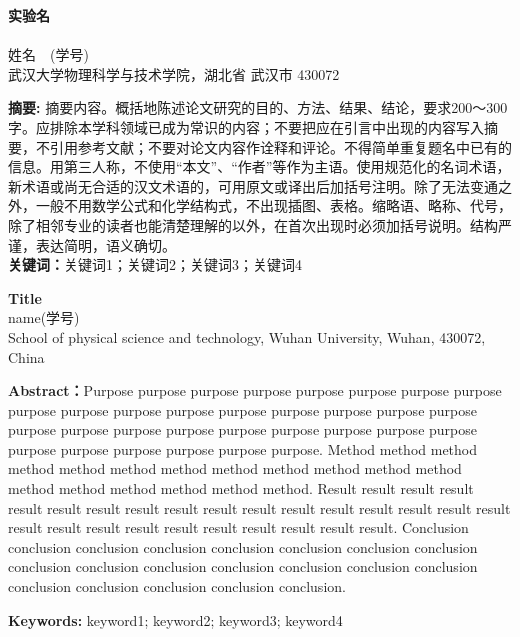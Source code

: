 \documentclass{whureport}
\newcommand{\name}{姓名}
\newcommand{\stuid}{学号}
\newcommand{\Name}{name}
\newcommand{\newtitle}{实验名}
\newcommand{\etitle}{Title}
\begin{document}
\pagestyle{maincontent} 


\begin{center}
 \textbf{\newtitle}\\
~\\
 \kaishu \name \ \ (\stuid)\\
 \kaishu 武汉大学物理科学与技术学院，湖北省 武汉市 430072\\
\end{center}
\textbf{摘\quad 要:}
摘要内容。概括地陈述论文研究的目的、方法、结果、结论，要求200～300字。应排除本学科领域已成为常识的内容；不要把应在引言中出现的内容写入摘要，不引用参考文献；不要对论文内容作诠释和评论。不得简单重复题名中已有的信息。用第三人称，不使用“本文”、“作者”等作为主语。使用规范化的名词术语，新术语或尚无合适的汉文术语的，可用原文或译出后加括号注明。除了无法变通之外，一般不用数学公式和化学结构式，不出现插图、表格。缩略语、略称、代号，除了相邻专业的读者也能清楚理解的以外，在首次出现时必须加括号说明。结构严谨，表达简明，语义确切。\\
\textbf{关键词：}关键词1；关键词2；关键词3；关键词4
~\\
\begin{center}
	 \textbf{\etitle}\\
	 \Name\quad (\stuid)\\
	 School of physical science and technology, Wuhan University, Wuhan, 430072, China
\end{center}

\textbf{Abstract：}Purpose purpose purpose purpose purpose purpose purpose purpose purpose purpose purpose purpose purpose purpose purpose purpose purpose purpose purpose purpose purpose purpose purpose purpose purpose purpose purpose purpose purpose purpose purpose purpose. Method method method method method method method method method method method method method method method method method method. Result result result result result result result result result result result result result result result result result result result result result result result result result result result. Conclusion conclusion conclusion conclusion conclusion conclusion conclusion conclusion conclusion conclusion conclusion conclusion conclusion conclusion conclusion conclusion conclusion conclusion conclusion conclusion.

\textbf{Keywords: }keyword1; keyword2; keyword3; keyword4
\end{document}
